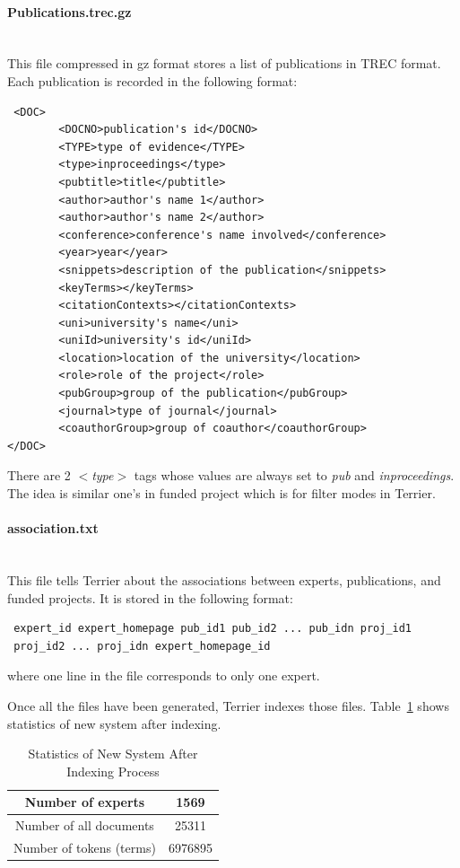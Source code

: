 \paragraph{Publications.trec.gz} \hspace{0pt} \\
This file compressed in gz format stores a list of publications in TREC format. Each publication is recorded in the following format:
\begin{verbatim}
 <DOC>
        <DOCNO>publication's id</DOCNO>
        <TYPE>type of evidence</TYPE>
        <type>inproceedings</type>
        <pubtitle>title</pubtitle>
        <author>author's name 1</author>
        <author>author's name 2</author>
        <conference>conference's name involved</conference>
        <year>year</year>
        <snippets>description of the publication</snippets>
        <keyTerms></keyTerms>
        <citationContexts></citationContexts>
        <uni>university's name</uni>
        <uniId>university's id</uniId>
        <location>location of the university</location>
        <role>role of the project</role>
        <pubGroup>group of the publication</pubGroup>
        <journal>type of journal</journal>
        <coauthorGroup>group of coauthor</coauthorGroup>
</DOC>
\end{verbatim}
There are 2 \textit{$<$type$>$} tags whose values are always set to \textit{pub} and \textit{inproceedings}. The idea is similar one's in 
funded project which is for filter modes in Terrier.

\paragraph{association.txt} \hspace{0pt} \\
This file tells Terrier about the associations between experts, publications, and funded projects. It is stored in the following format:
\begin{verbatim}
 expert_id expert_homepage pub_id1 pub_id2 ... pub_idn proj_id1 
 proj_id2 ... proj_idn expert_homepage_id
\end{verbatim}
where one line in the file corresponds to only one expert.

Once all the files have been generated, Terrier indexes those files. Table~\ref{table:newtstats} shows statistics of new system after indexing.

\begin{table}
\centering
\begin{tabular}{|c|c|}
\hline Number of experts & 1569 \\
\hline Number of all documents   & 25311 \\ 
\hline Number of tokens (terms) & 6976895 \\
\hline
\end{tabular}
\caption{Statistics of New System After Indexing Process} \label{table:newtstats}
\end{table}




